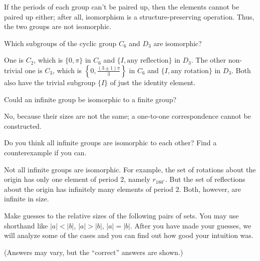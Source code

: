 \documentclass[../gatm_answers.tex]{subfiles}
\begin{document}
If the periods of each group can't be paired up, then the elements cannot be paired up either; after all, isomorphism is a structure-preserving operation. Thus, the two groups are not isomorphic.

\begin{inner_problem}
\item Which subgroups of the cyclic group $C_6$ and $D_3$ are isomorphic?
\end{inner_problem}

One is $C_2$, which is $\{0,\pi\}$ in $C_6$ and $\{I,\text{any reflection}\}$ in $D_3$. The other non-trivial one is $C_3$, which is $\left\{0,\frac{(3\pm 1)\pi}{3}\right\}$ in $C_6$ and $\{I,\text{any rotation}\}$ in $D_3$. Both also have the trivial subgroup $\{I\}$ of just the identity element.

\begin{outer_problem}
\item Could an infinite group be isomorphic to a finite group?
\end{outer_problem}

No, because their sizes are not the same; a one-to-one correspondence cannot be constructed.

\begin{outer_problem}
\item Do you think all infinite groups are isomorphic to each other? Find a counterexample if you can.
\end{outer_problem}

Not all infinite groups are isomorphic. For example, the set of rotations about the origin has only one element of period $2$, namely $r_{180^\circ}$. But the set of reflections about the origin has infinitely many elements of period $2$. Both, however, are infinite in size.

\begin{outer_problem}
\item Make guesses to the relative sizes of the following pairs of sets. You may use shorthand like $|a| < |b|$, $|a| > |b|$, $|a| = |b|$. After you have made your guesses, we will analyze some of the cases and you can find out how good your intuition was.
\end{outer_problem}

(Answers may vary, but the ``correct'' answers are shown.)
\end{document}

